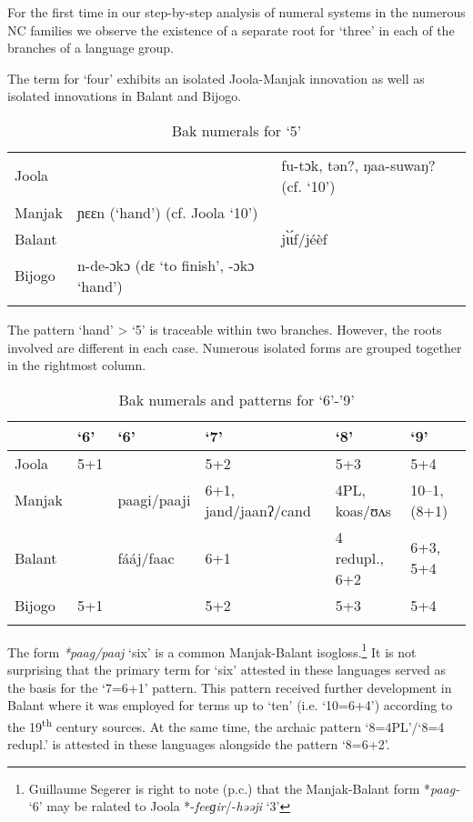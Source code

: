 For the first time in our step-by-step analysis of numeral systems in the numerous NC families we observe the existence of a separate root for ‘three’ in each of the branches of a language group.

The term for ‘four’ exhibits an isolated Joola-Manjak innovation as well as isolated innovations in Balant and Bijogo.


\begin{table}
\caption{\label{tab:3:244}Bak numerals for `5'}
\begin{tabularx}{\textwidth}{lQl}
\lsptoprule
{Joola} &  & fu-tɔk, tən?, ŋaa-suwaŋ? (cf. `10')\\
{Manjak} & ɲɛɛn (‘hand’) (cf. Joola `10') & \\
{Balant} &  & j{\`{ɩ}}{\'{ɩ}}f/jéèf\\
{Bijogo} & n-de-ɔkɔ (dɛ ‘to finish’, -ɔkɔ ‘hand’) & \\
\lspbottomrule
\end{tabularx}
\end{table}

The pattern ‘hand’ > ‘5’ is traceable within two branches. However, the roots involved are different in each case. Numerous isolated forms are grouped together in the rightmost column.


\begin{table}
\caption{\label{tab:3:245}Bak numerals and patterns for `6'-'9'}
\begin{tabularx}{\textwidth}{llQQll}
\lsptoprule
~ & `6' & `6' & `7' & `8' & `9' \\
\midrule
{Joola} & 5+1 &  & 5+2 & 5+3 & 5+4\\
{Manjak} &  & paagi/paaji & 6+1, jand/jaanʔ/cand & 4PL, koas/ʊʌs & 10--1, (8+1)\\
{Balant} &  & fááj/faac & 6+1 & 4 redupl., 6+2 & 6+3, 5+4\\
{Bijogo} & 5+1 &  & 5+2 & 5+3 & 5+4\\
\lspbottomrule
\end{tabularx}
\end{table}

The form \textit{*paag/paaj} ‘six’ is a common Manjak-Balant isogloss.\footnote{Guillaume Segerer is right to note (p.c.) that the Manjak-Balant form *\textit{paag-} ‘6’ may be ralated to Joola  *-\textit{feeɡir}/-\textit{həəji} ‘3’}  It is not surprising that the primary term for ‘six’ attested in these languages served as the basis for the ‘7=6+1’ pattern. This pattern received further development in Balant where it was employed for terms up to ‘ten’ (i.e. ‘10=6+4’) according to the 19\textsuperscript{th} century sources. At the same time, the archaic pattern ‘8=4PL’/‘8=4 redupl.’ is attested in these languages alongside the pattern ‘8=6+2’.

